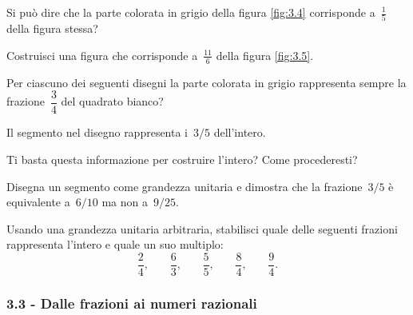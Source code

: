\begin{esercizio}
 \label{ese:3.11}
Si può dire che la parte colorata in grigio della figura \ref{fig:3.4} corrisponde a~$\frac{1}{5}$ della figura stessa?
\end{esercizio}

\begin{esercizio}
 \label{ese:3.12}
Costruisci una figura che corrisponde a~$\frac{11}{6}$ della figura \ref{fig:3.5}.
\end{esercizio}

\begin{esercizio}
 \label{ese:3.13}
Per ciascuno dei seguenti disegni la parte colorata in grigio rappresenta sempre la frazione~$\dfrac{3}{4}$
del quadrato bianco?
 \begin{center}
 
 \end{center}
\end{esercizio}

\begin{esercizio}
 \label{ese:3.14}
Il segmento nel disegno rappresenta i~$3/5$ dell'intero.
 \begin{center}
 
 \end{center}
Ti basta questa informazione per costruire l'intero? Come procederesti?
\end{esercizio}

\begin{esercizio}
 \label{ese:3.15}
Disegna un segmento come grandezza unitaria e dimostra che la frazione~$3/5$ è equivalente a~$6/10$ ma non a~$9/25$.
% 
\end{esercizio}

\begin{esercizio}
 \label{ese:3.16}
Usando una grandezza unitaria arbitraria, stabilisci quale delle seguenti frazioni
rappresenta l'intero e quale un suo multiplo:
\[\dfrac{2}{4}\text{,}\qquad\dfrac{6}{3}\text{,}\qquad\dfrac{5}{5}\text{,}\qquad\dfrac{8}{4}\text{,}\qquad
\dfrac{9}{4}.\]
\end{esercizio}

\subsubsection*{3.3 - Dalle frazioni ai numeri razionali}

